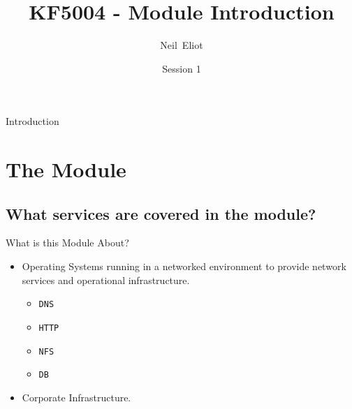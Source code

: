 \documentclass{beamer}
\title{KF5004 - Module Introduction}
\author{Neil~Eliot\inst{1}}
\institute[Northumbria University] %
{
  \inst{1}
  Department of Computer and Information Sciences\\
  University of Northumbria
}
\date{Session 1}
\begin{document}
\begin{frame}
  \titlepage
\end{frame}

\begin{frame}{Introduction}
  \tableofcontents
\end{frame}


\section{The Module}
\subsection{What services are covered in the module?}
\begin{frame}{What is this Module About?}
  \begin{itemize}
    \item Operating Systems running in a networked environment to provide network services and operational infrastructure.
    \begin{itemize}
      \item \texttt{DNS}
      \item \texttt{HTTP}
      \item \texttt{NFS}
      \item \texttt{DB}
    \end{itemize}
    \item Corporate Infrastructure.
  \end{itemize}
\end{frame}
\end{document}
